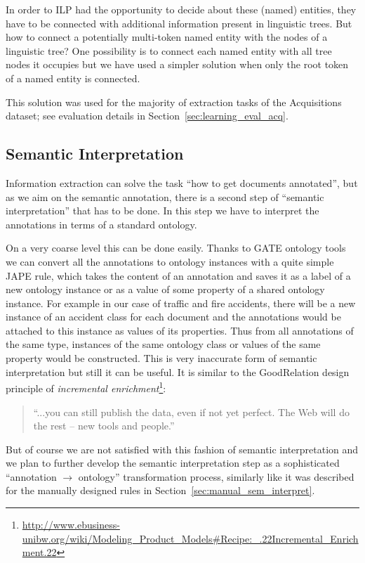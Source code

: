 In order to ILP had the opportunity to decide about these (named) entities, they have to be connected with additional information present in linguistic trees. But how to connect a potentially multi-token named entity with the nodes of a linguistic tree? One possibility is to connect each named entity with all tree nodes it occupies but we have used a simpler solution when only the root token of a named entity is connected.

This solution was used for the majority of extraction tasks of the Acquisitions dataset; see evaluation details in Section~\ref{sec:learning_eval_acq}.

\subsection{Semantic Interpretation} \label{sec:learning_SemanticInterpretation}

Information extraction can solve the task ``how to get documents annotated'', but as we aim on the semantic annotation, there is a second step of ``semantic interpretation'' that has to be done. In this step we have to interpret the annotations in terms of a standard ontology. 

On a very coarse level this can be done easily. Thanks to GATE ontology tools \citep{Bon04b} we can convert all the annotations to ontology instances with a quite simple JAPE \citep{Cunningham00jape:a} rule, which takes the content of an annotation and saves it as a label of a new ontology instance or as a value of some property of a shared ontology instance. For example in our case of traffic and fire accidents, there will be a new instance of an accident class for each document and the annotations would be attached to this instance as values of its properties. Thus from all annotations of the same type, instances of the same ontology class or values of the same property would be constructed. This is very inaccurate form of semantic interpretation but still it can be useful. It is similar to the GoodRelation \citep{DBLP:conf/ekaw/Hepp08} design principle of \emph{incremental enrichment}\footnote{\url{http://www.ebusiness-unibw.org/wiki/Modeling_Product_Models#Recipe:_.22Incremental_Enrichment.22}}:

\begin{quote}
``...you can still publish the data, even if not yet perfect. The Web will do the rest -- new tools and people.''	
\end{quote}

But of course we are not satisfied with this fashion of semantic interpretation and we plan to further develop the semantic interpretation step as a sophisticated ``annotation $\rightarrow$ ontology'' transformation process, similarly like it was described for the manually designed rules in Section~\ref{sec:manual_sem_interpret}.



